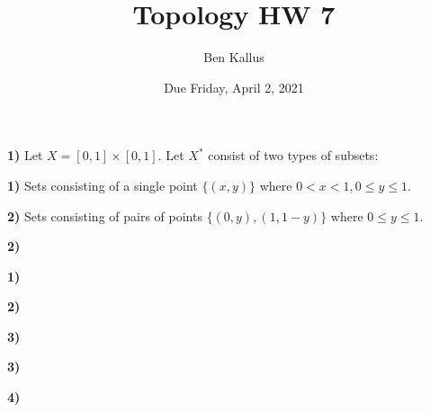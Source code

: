 \documentclass[12pt]{report}
\title{Topology HW 7}
\author{Ben Kallus}
\date{Due Friday, April 2, 2021}
\begin{document}
\maketitle

\newpage\noindent\textbf{1)} Let $X = [0,1] \times [0,1]$. Let $X^*$ consist of two types of subsets:

\medskip\textbf{1)} Sets consisting of a single point $\{(x,y)\}$ where $0 < x < 1, 0 \leq y \leq 1.$



\medskip\textbf{2)} Sets consisting of pairs of points $\{(0,y), (1,1-y)\}$ where $0 \leq y \leq 1.$



\newpage\noindent\textbf{2)}

\medskip\textbf{1)}



\medskip\textbf{2)}



\medskip\textbf{3)}



\newpage\noindent\textbf{3)}



\newpage\noindent\textbf{4)}
\end{document}
